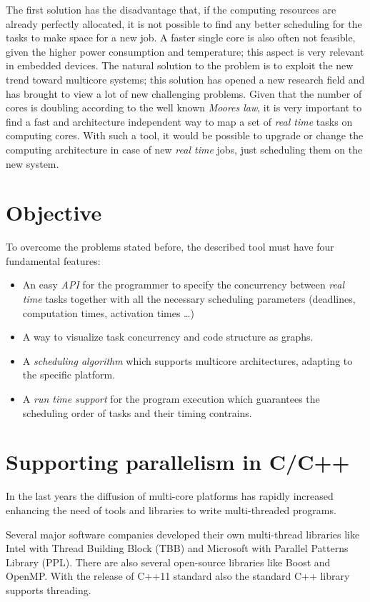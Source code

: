 \documentclass[a4paper,11pt,oneside]{book}
\begin{document}
The first solution has the disadvantage that, if the computing resources are already perfectly allocated, it is not possible to find any better scheduling for the tasks to make space for a new job. A faster single core is also often not feasible, given the higher power consumption and temperature; this aspect is very relevant in embedded devices. 
The natural solution to the problem is to exploit the new trend toward multicore systems; this solution has opened a new research field and has brought to view a lot of new challenging problems. Given that the number of cores is doubling according to the well known \emph{Moores law}, it is very important to find a fast and architecture independent way to map a set of \emph{real time} tasks on computing cores. With such a tool, it would be possible to upgrade or change the computing architecture in case of new \emph{real time} jobs, just scheduling them on the new system.


\section{Objective}

To overcome the problems stated before, the described tool must have four fundamental features:
\begin{itemize}
\item{An easy \emph{API} for the programmer to specify the concurrency between \emph{real time} tasks together with all the necessary scheduling parameters (deadlines, computation times, activation times \dots)}
\item{A way to visualize task concurrency and code structure as graphs.}
\item{A \emph{scheduling algorithm} which supports multicore architectures, adapting to the specific platform.}
\item{A \emph{run time support} for the program execution which guarantees the scheduling order of tasks and their timing contrains.}
\end{itemize}


\section{Supporting parallelism in C/C++}

In the last years the diffusion of multi-core platforms has rapidly increased enhancing the need of tools and libraries to write multi-threaded programs. 

Several major software companies developed their own multi-thread libraries like Intel with Thread Building Block (TBB) and Microsoft with Parallel Patterns Library (PPL). There are also several open-source libraries like Boost and OpenMP. With the release of C++11 standard also the standard C++ library supports threading.
\end{document}
